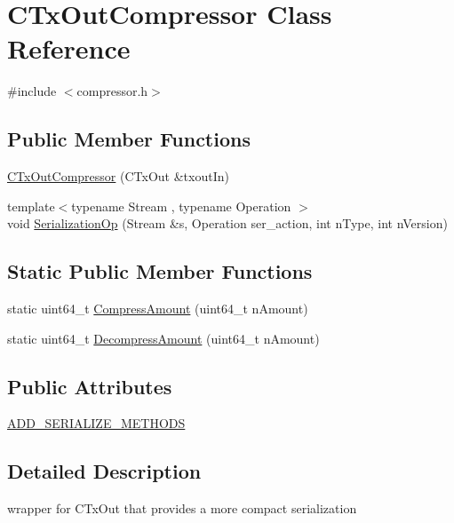 \hypertarget{class_c_tx_out_compressor}{}\section{C\+Tx\+Out\+Compressor Class Reference}
\label{class_c_tx_out_compressor}


{\ttfamily \#include $<$compressor.\+h$>$}

\subsection*{Public Member Functions}
\begin{DoxyCompactItemize}
\item 
\hyperlink{class_c_tx_out_compressor_a38ef1033989cd003de65598620d15cea}{C\+Tx\+Out\+Compressor} (C\+Tx\+Out \&txout\+In)
\item 
{\footnotesize template$<$typename Stream , typename Operation $>$ }\\void \hyperlink{class_c_tx_out_compressor_aad933ec09f7d6a764bd49da399f9083b}{Serialization\+Op} (Stream \&s, Operation ser\+\_\+action, int n\+Type, int n\+Version)
\end{DoxyCompactItemize}
\subsection*{Static Public Member Functions}
\begin{DoxyCompactItemize}
\item 
static uint64\+\_\+t \hyperlink{class_c_tx_out_compressor_a4141cec8885a2da956abb79130c963a8}{Compress\+Amount} (uint64\+\_\+t n\+Amount)
\item 
static uint64\+\_\+t \hyperlink{class_c_tx_out_compressor_a97751249d6a23b2a2b7bbc1165973371}{Decompress\+Amount} (uint64\+\_\+t n\+Amount)
\end{DoxyCompactItemize}
\subsection*{Public Attributes}
\begin{DoxyCompactItemize}
\item 
\hyperlink{class_c_tx_out_compressor_a520b323886560ededcfe303c4672481e}{A\+D\+D\+\_\+\+S\+E\+R\+I\+A\+L\+I\+Z\+E\+\_\+\+M\+E\+T\+H\+O\+D\+S}
\end{DoxyCompactItemize}


\subsection{Detailed Description}
wrapper for C\+Tx\+Out that provides a more compact serialization 

